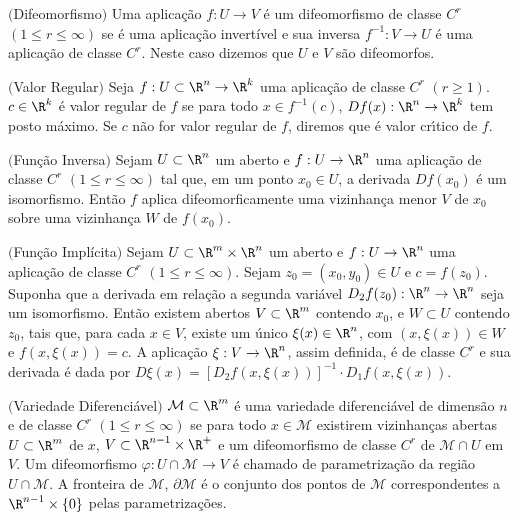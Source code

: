 \begin{defi} $($Difeomorfismo$)$
Uma aplicação $f : U \rightarrow V$ é um difeomorfismo de classe $C^r$ $(1 \le r \le \infty)$ se é uma aplicação invertível e sua inversa $f^{-1} : V \rightarrow U$ é uma aplicação de classe $C^r$.
Neste caso dizemos que $U$ e $V$ são difeomorfos.
\end{defi}

\begin{defi} $($Valor Regular$)$
Seja $f : U \subset \R^n \rightarrow \R^k$ uma aplicação de classe $C^r$ $(r \ge 1)$.  $c \in \R^k$ é valor regular de $f$ se para todo $x \in f^{-1}(c)$, $Df(x): \R^n \rightarrow \R^k$ tem posto máximo.  Se $c$ n\~ao for valor regular de $f$, diremos que \'e valor cr\'{\i}tico de $f$. 
\end{defi}

\begin{teore} $($Função Inversa$)$
Sejam $U \subset \R^n$ um aberto e $f : U \rightarrow \R^n$ uma aplicação de classe $C^r$ $(1 \le r \le \infty)$ tal que, em um ponto $x_0 \in U$, a derivada $Df(x_0)$ é um isomorfismo. Então $f$ aplica difeomorficamente uma vizinhança menor $V$ de $x_0$ sobre uma vizinhança $W$ de $f(x_0)$.
\end{teore}

\begin{teore} $($Função Implícita$)$
Sejam $U \subset \R^m \times \R^n$ um aberto e $f : U \rightarrow \R^n$ uma aplicação de classe $C^r$ $(1 \le r \le \infty)$. Sejam  $z_0 = (x_0,y_0) \in U$ e $c = f(z_0)$. 
Suponha que a derivada em relação a segunda variável $D_2f(z_0): \R^n \rightarrow \R^n$ seja um isomorfismo. 
Então existem abertos $V \subset \R^m$ contendo $x_0$, e $W \subset U$ contendo $z_0$, tais que, para cada $x \in V$, existe um único $\xi(x) \in \R^n$, com $(x,\xi(x)) \in W$ e $f(x,\xi(x)) = c$.
A aplicação $\xi : V \rightarrow \R^n$, assim definida, é de classe $C^r$ e sua derivada é dada por
$D\xi(x) = [D_2f(x,\xi(x))]^{-1} \cdot D_1f(x,\xi(x))$.
\end{teore}

\begin{defi} $($Variedade Diferenciável$)$
$\mathcal{M} \subset \R^m$ é uma variedade diferenciável de dimensão $n$ e de classe $C^r$ $(1 \le r \le \infty)$ 
se para todo $x \in \mathcal{M}$ existirem vizinhanças abertas $U \subset \R^m$ de $x$, 
$V \subset \R^{n-1} \times \R^{+}$ e um difeomorfismo de classe $C^r$ de $\mathcal{M} \cap U$ em $V$.  
Um difeomorfismo $\varphi : U \cap \mathcal{M}  \rightarrow V$ \'e chamado de parametriza\c c\~ao da regi\~ao $U \cap \mathcal{M}$. A fronteira de $\mathcal{M}$, $\partial \mathcal{M}$ \'e o conjunto dos pontos de $\mathcal{M}$ correspondentes a $\R^{n-1} \times \{0\}$ pelas parametriza\c c\~oes. 
\end{defi}

